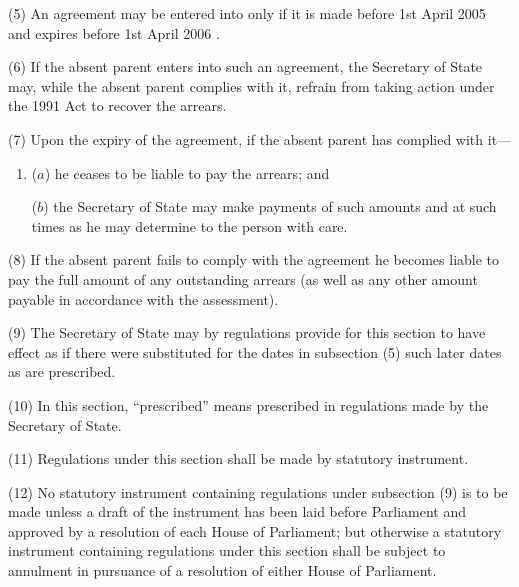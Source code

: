 \documentclass[12pt,a4paper]{article}
\begin{document}
(5) An agreement may be entered into only if it is made before 1st April 
2005  %
and expires before 1st April 
2006%
. 

(6) If the absent parent enters into such an agreement, the Secretary of State may, while the absent parent complies with it, refrain from taking action under the 1991 Act to recover the arrears.

(7) Upon the expiry of the agreement, if the absent parent has complied with it—
\begin{enumerate}\item[]
($a$) he ceases to be liable to pay the arrears; and

($b$) the Secretary of State may make payments of such amounts and at such times as he may determine to the person with care.
\end{enumerate}

(8) If the absent parent fails to comply with the agreement he becomes liable to pay the full amount of any outstanding arrears (as well as any other amount payable in accordance with the assessment).

(9) The Secretary of State may by regulations provide for this section to have effect as if there were substituted for the dates in subsection (5)  such later dates as are prescribed.

(10) In this section, “prescribed” means prescribed in regulations made by the Secretary of State.

(11) Regulations under this section shall be made by statutory instrument.

(12) No statutory instrument containing regulations under subsection (9)  is to be made unless a draft of the instrument has been laid before Parliament and approved by a resolution of each House of Parliament; but otherwise a statutory instrument containing regulations under this section shall be subject to annulment in pursuance of a resolution of either House of Parliament.

\end{document}
